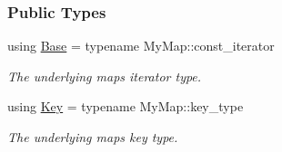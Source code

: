 \subsubsection*{Public Types}
\begin{DoxyCompactItemize}
\item 
using \hyperlink{structslb_1_1core_1_1util_1_1MapKeyConstIterator_a9eb6587b8011f451cb49ead9a1cd437e}{Base} = typename My\+Map\+::const\+\_\+iterator\hypertarget{structslb_1_1core_1_1util_1_1MapKeyConstIterator_a9eb6587b8011f451cb49ead9a1cd437e}{}\label{structslb_1_1core_1_1util_1_1MapKeyConstIterator_a9eb6587b8011f451cb49ead9a1cd437e}

\begin{DoxyCompactList}\small\item\em The underlying map\textquotesingle{}s iterator type. \end{DoxyCompactList}\item 
using \hyperlink{structslb_1_1core_1_1util_1_1MapKeyConstIterator_a98657d57422f971f27ae68bcd34d4543}{Key} = typename My\+Map\+::key\+\_\+type\hypertarget{structslb_1_1core_1_1util_1_1MapKeyConstIterator_a98657d57422f971f27ae68bcd34d4543}{}\label{structslb_1_1core_1_1util_1_1MapKeyConstIterator_a98657d57422f971f27ae68bcd34d4543}

\begin{DoxyCompactList}\small\item\em The underlying map\textquotesingle{}s key type. \end{DoxyCompactList}\end{DoxyCompactItemize}
